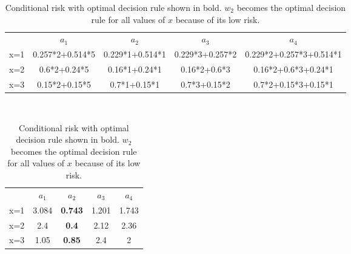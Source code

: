 \documentclass[12pt]{article}
\begin{document}
\begin{enumerate}
  \begin{table}[H]
  \centering
  \begin{tabular}{ccccc}
    & $a_1$ & $a_2$ & $a_3$ & $a_4$ \\
    x=1 & 0.257*2+0.514*5 & 0.229*1+0.514*1 & 0.229*3+0.257*2 & 0.229*2+0.257*3+0.514*1\\
    x=2 & 0.6*2+0.24*5 & 0.16*1+0.24*1 & 0.16*2+0.6*3 & 0.16*2+0.6*3+0.24*1 \\
    x=3 & 0.15*2+0.15*5 & 0.7*1+0.15*1 & 0.7*3+0.15*2 & 0.7*2+0.15*3+0.15*1
  \end{tabular}
  \\
  \begin{tabular}{ccccc}
    & $a_1$ & $a_2$ & $a_3$ & $a_4$ \\
    x=1 & 3.084 & \textbf{0.743} & 1.201 & 1.743\\
    x=2 & 2.4 & \textbf{0.4} & 2.12 & 2.36 \\
    x=3 & 1.05 & \textbf{0.85} & 2.4 & 2
  \end{tabular}
  \caption{Conditional risk with optimal decision rule shown in bold. $w_2$ becomes the optimal decision rule for all values of $x$ because of its low risk.}
  \end{table}
\end{enumerate}
\end{document}

